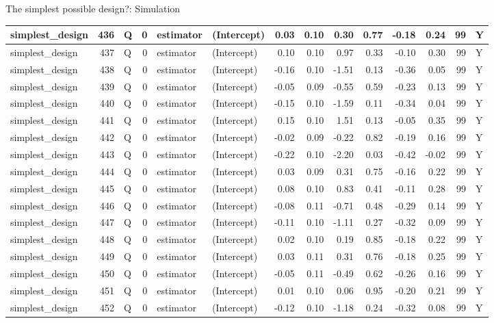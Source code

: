 \documentclass[
  11pt,
  ignorenonframetext,
]{beamer}
\begin{document}
\begin{frame}[fragile]{The simplest possible design?: Simulation}
\begin{tabular}{l|r|l|r|l|l|r|r|r|r|r|r|r|l}
\hline
simplest\_design & 436 & Q & 0 & estimator & (Intercept) & 0.03 & 0.10 & 0.30 & 0.77 & -0.18 & 0.24 & 99 & Y\\
\hline
simplest\_design & 437 & Q & 0 & estimator & (Intercept) & 0.10 & 0.10 & 0.97 & 0.33 & -0.10 & 0.30 & 99 & Y\\
\hline
simplest\_design & 438 & Q & 0 & estimator & (Intercept) & -0.16 & 0.10 & -1.51 & 0.13 & -0.36 & 0.05 & 99 & Y\\
\hline
simplest\_design & 439 & Q & 0 & estimator & (Intercept) & -0.05 & 0.09 & -0.55 & 0.59 & -0.23 & 0.13 & 99 & Y\\
\hline
simplest\_design & 440 & Q & 0 & estimator & (Intercept) & -0.15 & 0.10 & -1.59 & 0.11 & -0.34 & 0.04 & 99 & Y\\
\hline
simplest\_design & 441 & Q & 0 & estimator & (Intercept) & 0.15 & 0.10 & 1.51 & 0.13 & -0.05 & 0.35 & 99 & Y\\
\hline
simplest\_design & 442 & Q & 0 & estimator & (Intercept) & -0.02 & 0.09 & -0.22 & 0.82 & -0.19 & 0.16 & 99 & Y\\
\hline
simplest\_design & 443 & Q & 0 & estimator & (Intercept) & -0.22 & 0.10 & -2.20 & 0.03 & -0.42 & -0.02 & 99 & Y\\
\hline
simplest\_design & 444 & Q & 0 & estimator & (Intercept) & 0.03 & 0.09 & 0.31 & 0.75 & -0.16 & 0.22 & 99 & Y\\
\hline
simplest\_design & 445 & Q & 0 & estimator & (Intercept) & 0.08 & 0.10 & 0.83 & 0.41 & -0.11 & 0.28 & 99 & Y\\
\hline
simplest\_design & 446 & Q & 0 & estimator & (Intercept) & -0.08 & 0.11 & -0.71 & 0.48 & -0.29 & 0.14 & 99 & Y\\
\hline
simplest\_design & 447 & Q & 0 & estimator & (Intercept) & -0.11 & 0.10 & -1.11 & 0.27 & -0.32 & 0.09 & 99 & Y\\
\hline
simplest\_design & 448 & Q & 0 & estimator & (Intercept) & 0.02 & 0.10 & 0.19 & 0.85 & -0.18 & 0.22 & 99 & Y\\
\hline
simplest\_design & 449 & Q & 0 & estimator & (Intercept) & 0.03 & 0.11 & 0.31 & 0.76 & -0.18 & 0.25 & 99 & Y\\
\hline
simplest\_design & 450 & Q & 0 & estimator & (Intercept) & -0.05 & 0.11 & -0.49 & 0.62 & -0.26 & 0.16 & 99 & Y\\
\hline
simplest\_design & 451 & Q & 0 & estimator & (Intercept) & 0.01 & 0.10 & 0.06 & 0.95 & -0.20 & 0.21 & 99 & Y\\
\hline
simplest\_design & 452 & Q & 0 & estimator & (Intercept) & -0.12 & 0.10 & -1.18 & 0.24 & -0.32 & 0.08 & 99 & Y\\

\end{tabular}
\end{frame}
\end{document}
